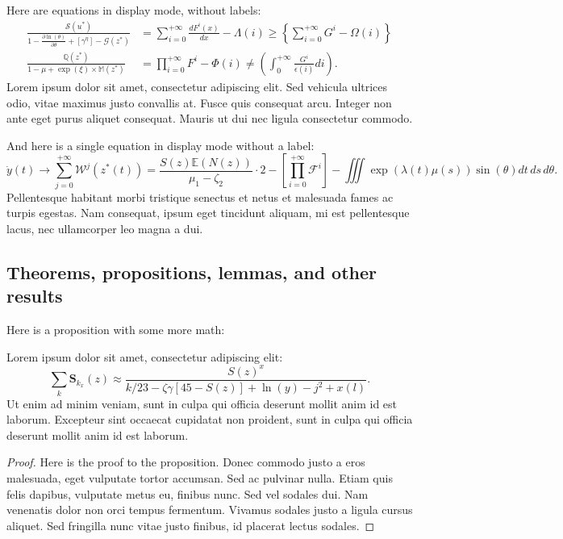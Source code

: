 \documentclass[letterpaper,11pt,leqno]{article}
\begin{document}
Here are equations in display mode, without labels:
\begin{align*}
\frac{\mathcal{S}(u^*)}{1 - \frac{\partial \ln(\theta)}{\partial \theta} + \left[\gamma^\eta\right] - \mathcal{G}(z^*)} &= \sum_{i=0}^{+\infty}\frac{d F^{i}(x)}{d x} - \Lambda(i) \geq \left\lbrace\sum_{i=0}^{+\infty}G^{i} - \Omega(i)\right\rbrace\\
\frac{\mathbb{Q}(z^*)}{1 -\mu + \exp(\xi) \times \mathbb{M}(z^*)} &= \prod_{i=0}^{+\infty}F^{i} - \Phi(i) \neq \left(\int_{0}^{+\infty}\frac{G^{i}}{\epsilon(i)} di\right).
\end{align*}
Lorem ipsum dolor sit amet, consectetur adipiscing elit. Sed vehicula ultrices odio, vitae maximus justo convallis at. Fusce quis consequat arcu. Integer non ante eget purus aliquet consequat. Mauris ut dui nec ligula consectetur commodo.

And here is a single equation in display mode without a label:
\begin{equation*}
\dot{y}(t) \to \sum_{j=0}^{+\infty}\mathcal{W}^j(z^{\ast}(t)) = \frac{S(z) \mathbb{E}(N(z))}{\mu_1 - \zeta_2} \cdot 2 - \left[\prod_{i=0}^{+\infty}\mathcal{F}^{i}\right]-\iiint\exp(\lambda(t) \mu(s)) \sin(\theta)dt\,ds\,d\theta.
\end{equation*}
Pellentesque habitant morbi tristique senectus et netus et malesuada fames ac turpis egestas. Nam consequat, ipsum eget tincidunt aliquam, mi est pellentesque lacus, nec ullamcorper leo magna a dui.

\subsection{Theorems, propositions, lemmas, and other results}

Here is a proposition with some more math:   
\begin{proposition}
Lorem ipsum dolor sit amet, consectetur adipiscing elit:
\begin{equation}
\sum_k\bm{S}_{k_x}(z) \approx \frac{S(z)^x}{k / 23 -\zeta\gamma [45- S(z)] + \ln(y) - j^2+x(l)}.
\label{e:type1}\end{equation}
Ut enim ad minim veniam, sunt in culpa qui officia deserunt mollit anim id est laborum. Excepteur sint occaecat cupidatat non proident, sunt in culpa qui officia deserunt mollit anim id est laborum.
\label{p:type1}\end{proposition}
\begin{proof} 
Here is the proof to the proposition. Donec commodo justo a eros malesuada, eget vulputate tortor accumsan. Sed ac pulvinar nulla. Etiam quis felis dapibus, vulputate metus eu, finibus nunc. Sed vel sodales dui. Nam venenatis dolor non orci tempus fermentum. Vivamus sodales justo a ligula cursus aliquet. Sed fringilla nunc vitae justo finibus, id placerat lectus sodales.
\end{proof} 
\end{document}
